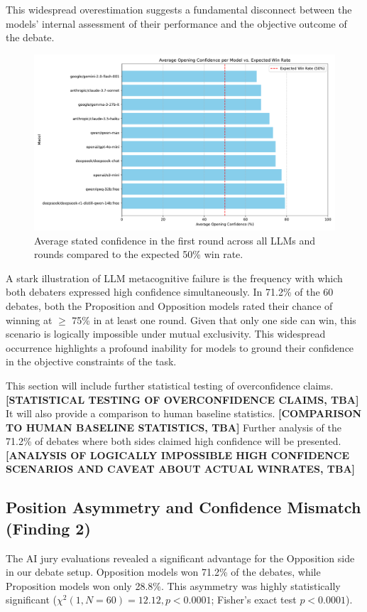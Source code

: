 \documentclass{article}
\begin{document}
This widespread overestimation suggests a fundamental disconnect between the models' internal assessment of their performance and the objective outcome of the debate.

\begin{figure}[h]
  \centering
  \includegraphics[width=0.8\linewidth]{figures/model_avg_opening_confidence_bar_chart.pdf}
  \caption{Average stated confidence in the first round across all LLMs and rounds compared to the expected 50\% win rate.}
  \label{fig:avg_confidence}
\end{figure}

A stark illustration of LLM metacognitive failure is the frequency with which both debaters expressed high confidence simultaneously. In 71.2\% of the 60 debates, both the Proposition and Opposition models rated their chance of winning at $\ge$ 75\% in at least one round. Given that only one side can win, this scenario is logically impossible under mutual exclusivity. This widespread occurrence highlights a profound inability for models to ground their confidence in the objective constraints of the task.

This section will include further statistical testing of overconfidence claims. \textbf{[STATISTICAL TESTING OF OVERCONFIDENCE CLAIMS, TBA]}
It will also provide a comparison to human baseline statistics. \textbf{[COMPARISON TO HUMAN BASELINE STATISTICS, TBA]}
Further analysis of the 71.2\% of debates where both sides claimed high confidence will be presented. \textbf{[ANALYSIS OF LOGICALLY IMPOSSIBLE HIGH CONFIDENCE SCENARIOS AND CAVEAT ABOUT ACTUAL WINRATES, TBA]}

\subsection{Position Asymmetry and Confidence Mismatch (Finding 2)}

The AI jury evaluations revealed a significant advantage for the Opposition side in our debate setup. Opposition models won 71.2\% of the debates, while Proposition models won only 28.8\%. This asymmetry was highly statistically significant ($\chi^2(1, N=60) = 12.12, p < 0.0001$; Fisher's exact test $p < 0.0001$).
\end{document}
